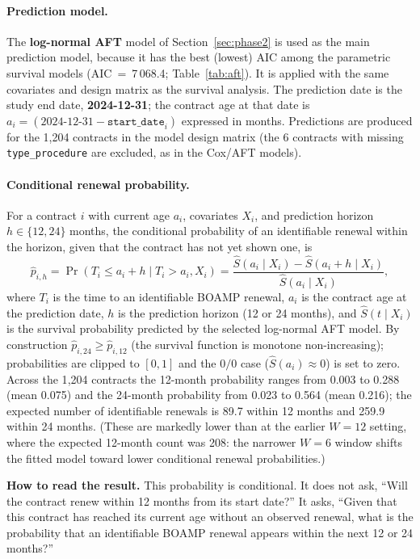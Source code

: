 \documentclass[12pt, a4paper]{article}
\begin{document}
\paragraph{Prediction model.} The \textbf{log-normal AFT} model of
Section~\ref{sec:phase2} is used as the main prediction model, because it has the best
(lowest) AIC among the parametric survival models (AIC~=~7\,068.4; Table~\ref{tab:aft}). It is
applied with the same covariates and design matrix as the survival analysis. The prediction
date is the study end date, \textbf{2024-12-31}; the contract age at that date is
\(a_i = (\text{2024-12-31} - \texttt{start\_date}_i)\) expressed in months. Predictions are
produced for the 1{,}204 contracts in the model design matrix (the 6 contracts with missing
\texttt{type\_procedure} are excluded, as in the Cox/AFT models).

\paragraph{Conditional renewal probability.} For a contract \(i\) with current age \(a_i\),
covariates \(X_i\), and prediction horizon \(h \in \{12,24\}\) months, the conditional
probability of an identifiable renewal within the horizon, given that the contract has not yet
shown one, is
\[
\hat{p}_{i,h}
=
\Pr(T_i \leq a_i+h \mid T_i>a_i, X_i)
=
\frac{\hat{S}(a_i \mid X_i)-\hat{S}(a_i+h \mid X_i)}
     {\hat{S}(a_i \mid X_i)},
\]
where \(T_i\) is the time to an identifiable BOAMP renewal, \(a_i\) is the contract age at the
prediction date, \(h\) is the prediction horizon (12 or 24 months), and
\(\hat{S}(t \mid X_i)\) is the survival probability predicted by the selected log-normal AFT
model. By construction \(\hat{p}_{i,24}\geq\hat{p}_{i,12}\) (the survival function is monotone
non-increasing); probabilities are clipped to \([0,1]\) and the \(0/0\) case
(\(\hat{S}(a_i)\approx 0\)) is set to zero. Across the 1{,}204 contracts the 12-month
probability ranges from 0.003 to 0.288 (mean 0.075) and the 24-month probability from 0.023
to 0.564 (mean 0.216); the expected number of identifiable renewals is 89.7 within 12 months
and 259.9 within 24 months. (These are markedly lower than at the earlier $W=12$ setting,
where the expected 12-month count was 208: the narrower $W=6$ window shifts the fitted
model toward lower conditional renewal probabilities.)

\textbf{How to read the result.} This probability is conditional. It does not
ask, ``Will the contract renew within 12 months from its start date?'' It asks,
``Given that this contract has reached its current age without an observed
renewal, what is the probability that an identifiable BOAMP renewal appears
within the next 12 or 24 months?''
\end{document}
